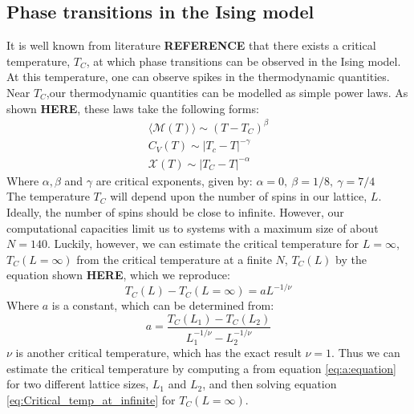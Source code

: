 \documentclass[a4paper, 10pt]{article}
\begin{document}
\subsection{Phase transitions in the Ising model}\label{phase_tranisition}
It is well known from literature \textbf{REFERENCE} that there exists a critical temperature, $T_C$, at which phase transitions can be observed in the Ising model. At this temperature, one can observe spikes in the thermodynamic quantities. Near $T_C$,our thermodynamic quantities can be modelled as simple power laws. As shown \textbf{HERE}, these laws take the following forms:
\begin{equation}\label{eq:analytical_thermo_near_critical}
\begin{split}
\langle \mathcal{M}(T)\rangle \sim (T-T_C)^{\beta}\\
C_V(T) \sim |T_c-T|^{-\gamma}\\
\mathcal{X}(T) \sim |T_C-T|^{-\alpha}
\end{split}
\end{equation}
Where $\alpha, \beta$ and $\gamma$ are critical exponents, given by: $\alpha=0,\  \beta=1/8,\ \gamma=7/4$\\
\linebreak
The temperature $T_C$ will depend upon the number of spins in our lattice, $L$. Ideally, the number of spins should be close to infinite. However, our computational capacities limit us to systems with a maximum size of about $N=140$. Luckily, however, we can estimate the critical temperature for $L=\infty$, $T_C(L=\infty)$ from the critical temperature at a finite $N$, $T_C(L)$ by the equation shown \textbf{HERE}, which we reproduce:
\begin{equation}\label{eq:Critical_temp_at_infinite}
T_C(L)-T_C(L=\infty)=aL^{-1/\nu}
\end{equation}
Where $a$ is a constant, which can be determined from:
\begin{equation}\label{eq:a:equation}
a=\frac{T_C(L_1)-T_C(L_2)}{L_1^{-1/\nu}-L_2^{-1/\nu}}
\end{equation}
$\nu$ is another critical temperature, which has the exact result $\nu=1$. Thus we can estimate the critical temperature by computing a from equation \ref{eq:a:equation} for two different lattice sizes, $L_1$ and $L_2$, and then solving equation \ref{eq:Critical_temp_at_infinite} for $T_C(L=\infty)$.
\end{document}
